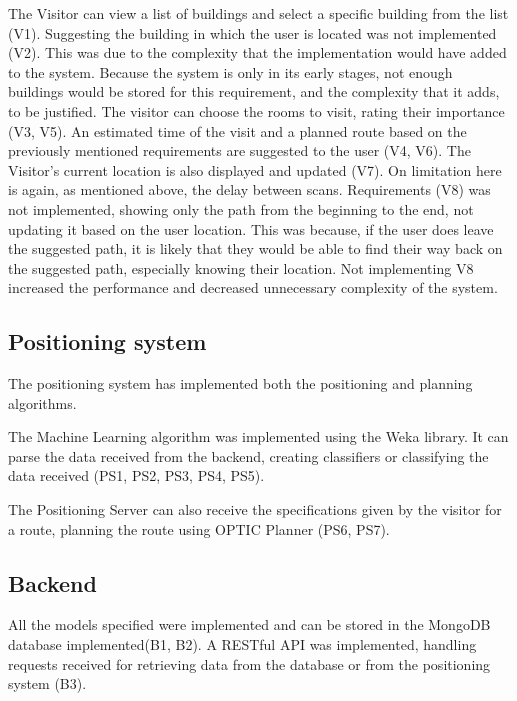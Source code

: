 The Visitor can view a list of buildings and select a specific building from the list (V1). Suggesting the building in which the user is located was not implemented (V2). This was due to the complexity that the implementation would have added to the system. Because the system is only in its early stages, not enough buildings would be stored for this requirement, and the complexity that it adds, to be justified. The visitor can choose the rooms to visit, rating their importance (V3, V5). An estimated time of the visit and a planned route based on the previously mentioned requirements are suggested to the user (V4, V6). The Visitor's current location is also displayed and updated (V7). On limitation here is again, as mentioned above, the delay between scans. Requirements (V8) was not implemented, showing only the path from the beginning to the end, not updating it based on the user location. This was because, if the user does leave the suggested path, it is likely that they would be able to find their way back on the suggested path, especially knowing their location. Not implementing V8 increased the performance and decreased unnecessary complexity of the system.

\subsection{Positioning system}
The positioning system has implemented both the positioning and planning algorithms. 

The Machine Learning algorithm was implemented using the Weka library. It can parse the data received from the backend, creating classifiers or classifying the data received (PS1, PS2, PS3, PS4, PS5). 

The Positioning Server can also receive the specifications given by the visitor for a route, planning the route using OPTIC Planner (PS6, PS7).

\subsection{Backend}
All the models specified were implemented and can be stored in the MongoDB database implemented(B1, B2). A RESTful API was implemented, handling requests received for retrieving data from the database or from the positioning system (B3).     




 
